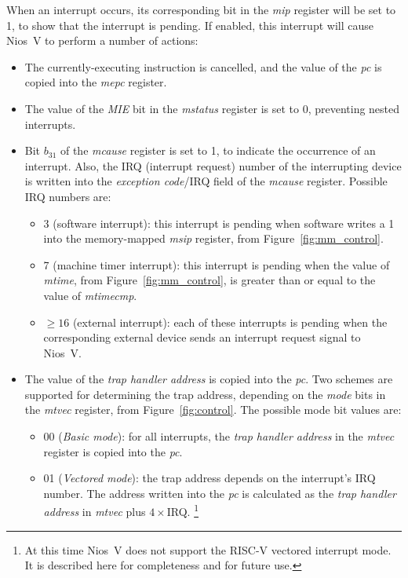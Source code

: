 \documentclass[11pt, twoside, pdftex]{article}
\begin{document}
When an interrupt occurs, its corresponding bit in the {\it mip} register will be set to
1, to show that the interrupt is pending.
If enabled, this interrupt will cause Nios~V to perform a number of actions:
\vspace{-\baselineskip}
\begin{itemize}
\item The currently-executing instruction is cancelled, and the value of the {\it pc} is 
copied into the {\it mepc} register. 
\item The value of the {\it MIE} bit in the {\it mstatus} register is set to 0, preventing
nested interrupts. 
\item Bit $b_{31}$ of the {\it mcause} register is set to 1, to indicate the occurrence of an
interrupt. Also, the IRQ (interrupt request) number of the interrupting device 
is written into the {\it exception code}/IRQ field of the {\it mcause} register. Possible
IRQ numbers are:
\begin{itemize}
\item 3 (software interrupt): this interrupt is pending when software writes a 1 into the
memory-mapped {\it msip} register, from Figure~\ref{fig:mm_control}. 
\item 7 (machine timer interrupt): this interrupt is pending when the value of {\it
mtime}, from Figure~\ref{fig:mm_control}, is greater than or equal to the value of {\it mtimecmp}. 
\item $\ge 16$ (external interrupt): each of these interrupts is pending when the corresponding
external device sends an interrupt request signal to Nios~V.
\end{itemize}
\item The value of the {\it trap handler address} is copied into the {\it pc}. Two schemes 
are supported for determining the trap address, depending on the {\it mode} bits in the 
{\it mtvec} register, from Figure~\ref{fig:control}.  The possible mode bit values are:
\begin{itemize}
\item 00 ({\it Basic mode}): for all interrupts, the {\it trap handler address} in the 
{\it mtvec} register is copied into the {\it pc}.
\item 01 ({\it Vectored mode}): the trap address depends on the interrupt's IRQ number. 
The address written into the {\it pc} is calculated as the {\it trap handler address} in
{\it mtvec} plus $4 \times $IRQ. 
\footnote{\label{foot:vectored} At this time Nios~V does not support the RISC-V 
vectored interrupt mode. It is described here for completeness and for future use.}
\end{itemize}
\end{itemize}
\end{document}
